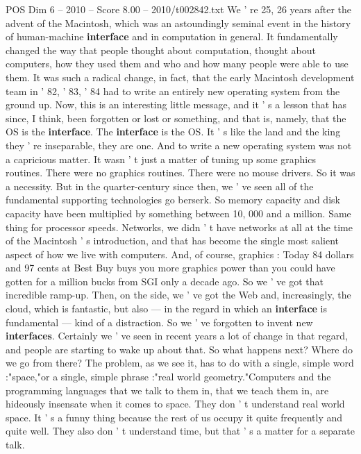 \begin{textsample}{POS Dim 6 – 2010 – Score 8.00 – 2010/t002842.txt}  \label{ex:f6_pos_038}
We ' re 25, 26 years after the advent of the Macintosh, which was an astoundingly seminal event in the history of human-machine \textbf{interface} and in computation in general.
It fundamentally changed the way that people thought about computation, thought about computers, how they used them and who and how many people were able to use them.
It was such a radical change, in fact, that the early Macintosh development team in ' 82, ' 83, ' 84 had to write an entirely new operating system from the ground up.
Now, this is an interesting little message, and it ' s a lesson that has since, I think, been forgotten or lost or something, and that is, namely, that the OS is the \textbf{interface}.
The \textbf{interface} is the OS.
It ' s like the land and the king they ' re inseparable, they are one.
And to write a new operating system was not a capricious matter.
It wasn ' t just a matter of tuning up some graphics routines.
There were no graphics routines.
There were no mouse drivers.
So it was a necessity.
But in the quarter-century since then, we ' ve seen all of the fundamental supporting technologies go berserk.
So memory capacity and disk capacity have been multiplied by something between 10, 000 and a million.
Same thing for processor speeds.
Networks, we didn ' t have networks at all at the time of the Macintosh ' s introduction, and that has become the single most salient aspect of how we live with computers.
And, of course, graphics : Today 84 dollars and 97 cents at Best Buy buys you more graphics power than you could have gotten for a million bucks from SGI only a decade ago.
So we ' ve got that incredible ramp-up.
Then, on the side, we ' ve got the Web and, increasingly, the cloud, which is fantastic, but also — in the regard in which an \textbf{interface} is fundamental — kind of a distraction.
So we ' ve forgotten to invent new \textbf{interfaces}.
Certainly we ' ve seen in recent years a lot of change in that regard, and people are starting to wake up about that.
So what happens next?
Where do we go from there?
The problem, as we see it, has to do with a single, simple word :"space,"or a single, simple phrase :"real world geometry."Computers and the programming languages that we talk to them in, that we teach them in, are hideously insensate when it comes to space.
They don ' t understand real world space.
It ' s a funny thing because the rest of us occupy it quite frequently and quite well.
They also don ' t understand time, but that ' s a matter for a separate talk.

\end{textsample}
